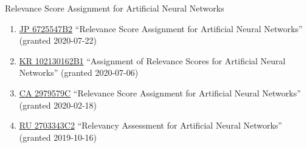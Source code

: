 \documentclass[10pt,a4paper]{article} %
\begin{document}

\newcommand{\patentref}[5]{\href{#4}{#1 #2} ``#3'' (granted #5)}
\headedsection %
{Relevance Score Assignment for Artificial Neural Networks}
{
    \begin{enumerate}
        \item [] \patentref{JP}
                           {6725547B2}
                           {Relevance Score Assignment for Artificial Neural Networks}
                           {https://patentimages.storage.googleapis.com/91/ba/cc/36792436528537/JP6725547B2.pdf}
                           {2020-07-22}

        \item [] \patentref{KR}
                           {102130162B1}
                           {Assignment of Relevance Scores for Artificial Neural Networks}
                           {https://patentimages.storage.googleapis.com/80/b5/17/210f687345bb31/KR102130162B1.pdf}
                           {2020-07-06}

        \item [] \patentref{CA}
                           {2979579C}
                           {Relevance Score Assignment for Artificial Neural Networks}
                           {https://patents.google.com/patent/CA2979579A1/en}
                           {2020-02-18}

        \item [] \patentref{RU}
                           {2703343C2}
                           {Relevancy Assessment for Artificial Neural Networks}
                           {https://patentimages.storage.googleapis.com/8d/ce/b5/70ef43a6d0f6e5/RU2703343C2.pdf}
                           {2019-10-16}
    \end{enumerate}
}


\spacedhrule{1.6em}{-0.4em} %



\end{document}
